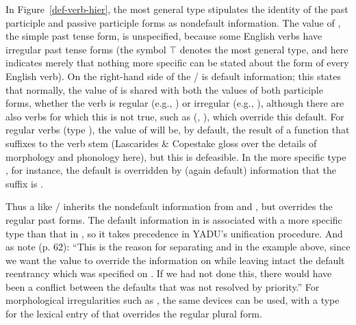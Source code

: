 \documentclass[output=paper
 	        ,biblatex
                ,babelshorthands
                ,newtxmath
                ,draftmode
                ,colorlinks, citecolor=brown
]{langscibook}
\begin{document}

In Figure~\ref{def-verb-hier}, the most general type  stipulates the identity of the past participle and passive participle forms as nondefault information. The value of , the simple past tense form, is unspecified, because some English verbs have irregular past tense forms (the symbol $\top$ denotes the most general type, and here indicates merely that nothing more specific can be stated about the  form of every English verb). On the right-hand side of the / is default information; this states that normally, the value of  is shared with both the values of both participle forms, whether the verb is regular (e.g., ) or irregular (e.g., ), although there are also verbs for which this is not true, such as  (, ), which override this default.  For regular verbs (type ), the value of  will be, by default, the result of a function that suffixes  to the verb stem (Lascarides \& Copestake gloss over the details of morphology and phonology here), but this is defeasible. In the more specific type , for instance, the default  is overridden by (again default) information that the suffix is .

Thus a  like / inherits the nondefault information from  and , but overrides the regular past forms.
The default information in  is associated with a more specific type than that in , so it takes precedence in YADU's unification procedure.
And as \citeauthor{LC99a} note (p. 62): ``This is the reason for separating  and  in the example above, since we want the  value to override the  information on  while leaving intact the default reentrancy which was specified on .  If we had not done this, there would have been a conflict between the defaults that was not resolved by priority.'' For morphological irregularities such as , the same devices can be used, with a type for the lexical entry of  that overrides the regular plural form.
\end{document}
